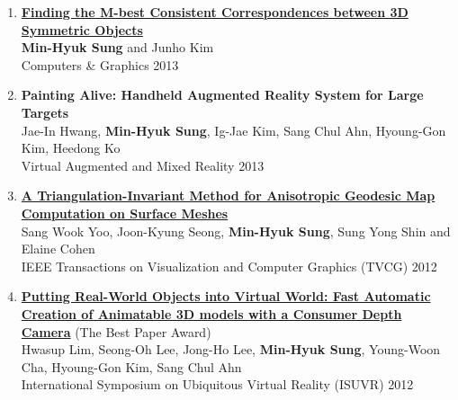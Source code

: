 \documentclass[letterpaper,10pt]{article} %
\newcommand{\blankline}{\quad\pagebreak[2]}
\begin{document}
{\begin{enumerate}
\item \label{cg13}
\href{http://dx.doi.org/10.1016/j.cag.2012.11.002}{\textbf{Finding the M-best Consistent Correspondences between 3D Symmetric Objects}} \\
\textbf{Min-Hyuk Sung} and Junho Kim\\
Computers \& Graphics 2013\\
\blankline

\item \label{vamr13}
\textbf{Painting Alive: Handheld Augmented Reality System for Large Targets} \\
Jae-In Hwang, \textbf{Min-Hyuk Sung}, Ig-Jae Kim, Sang Chul Ahn, Hyoung-Gon Kim, Heedong Ko\\
Virtual Augmented and Mixed Reality 2013\\
\blankline

\item \label{tvcg12}
\href{http://dx.doi.org/10.1109/TVCG.2012.29}{\textbf{A Triangulation-Invariant Method for Anisotropic Geodesic Map Computation on Surface Meshes}} \\
Sang Wook Yoo, Joon-Kyung Seong, \textbf{Min-Hyuk Sung}, Sung Yong Shin and Elaine Cohen\\
IEEE Transactions on Visualization and Computer Graphics (TVCG) 2012\\
\blankline

\item \label{isuvr12}
\href{http://dx.doi.org/10.1109/ISUVR.2012.12}{\textbf{Putting Real-World Objects into Virtual World: Fast Automatic Creation of Animatable 3D models with a Consumer Depth Camera}} (The Best Paper Award)\\
Hwasup Lim, Seong-Oh Lee, Jong-Ho Lee, \textbf{Min-Hyuk Sung}, Young-Woon Cha, Hyoung-Gon Kim, Sang Chul Ahn \\
International Symposium on Ubiquitous Virtual Reality (ISUVR) 2012\\
\blankline


\end{enumerate}}
\end{document}
